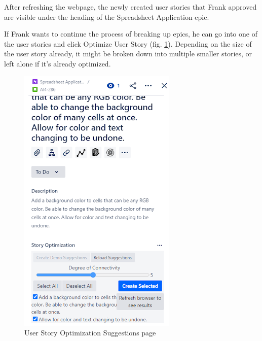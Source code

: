 After refreshing the webpage, the newly created user stories that Frank approved are visible under the heading of the Spreadsheet Application epic.

If Frank wants to continue the process of breaking up epics, he can go into one of the user stories and click Optimize User Story (fig. \ref{fig:Scenario1Figure3}). Depending on the size of the user story already, it might be broken down into multiple smaller stories, or left alone if it’s already optimized.

\begin{figure}
\centerline{\includegraphics[width=\textwidth,height=\textheight,keepaspectratio]{./figure/Scenario1Figure3.png}}
\caption{User Story Optimization Suggestions page}
\label{fig:Scenario1Figure3}
\end{figure}

